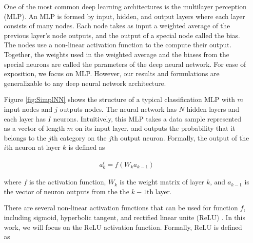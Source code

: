\documentclass[letterpaper]{article}
\begin{document}
\begin{flushleft}
{One of the most common deep learning architectures is the multilayer perception (MLP). 
An MLP is formed by input, hidden, and output layers where each layer consists of many nodes. Each node takes 
as input a weighted average of the previous layer's node outputs, and the output of a special node called the bias.  
The nodes use a non-linear activation function to the compute their output. Together, the weights used in the weighted average and
the biases from the special neurons are called the parameters of the deep neural network. 
For ease of exposition, we focus on MLP. However, our results and formulations are generalizable to any deep neural network
architecture. 




Figure \ref{fig:SimplNN} shows the structure of a typical classification MLP with $m$ input nodes and $j$ outputs nodes. The neural network
has $N$ hidden layers and each layer has $I$ neurons. Intuitively, this MLP takes a data sample represented as a vector of length
$m$ on its input layer, and outputs the probability that it belongs to the $j$th category on the $j$th output neuron.
Formally, the output of the $i$th neuron at layer $k$ is defined as

\begin{align}\label{eq:neuronOutput}
a^i_k=f(W_k a_{k-1})
\end{align}

where $f$ is the activation function, $W_k$ is the weight matrix of layer $k$,
and $a_{k-1}$ is the vector of neuron outputs from the the $k-1$th layer. 

There are several non-linear activation functions that can be used for function $f$, including sigmoid,
hyperbolic tangent, and rectified linear unite (ReLU) \cite{Goodfellow-et-al-2016}. In this
work, we will focus on the ReLU activation function. Formally, ReLU is defined as 

}
\end{flushleft}
\end{document}
